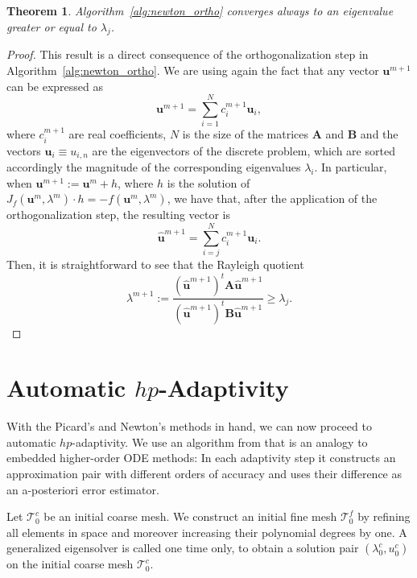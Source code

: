 \documentclass[preprint,12pt]{elsarticle}
\newtheorem{theorem}{Theorem}[section]
\newcommand{\cT}{\mathcal{T}}
\begin{document}
\begin{theorem}
Algorithm~\ref{alg:newton_ortho} converges always to an eigenvalue greater or equal to $\lambda_j$.
\end{theorem}

\begin{proof}
This result is a direct consequence of the orthogonalization step in Algorithm~\ref{alg:newton_ortho}.
We are using again the fact that any vector $\mathbf{u}^{m+1}$ can be expressed as 
$$
\mathbf{u}^{m+1}=\sum_{i=1}^N c_i^{m+1} \mathbf{u}_i,
$$
where $c_i^{m+1}$ are real coefficients, $N$ is the size of the matrices $\mathbf{A}$ and $\mathbf{B}$ and the vectors $\mathbf{u}_i\equiv u_{i,n}$ are the eigenvectors of the discrete problem, which are sorted accordingly the magnitude of the corresponding eigenvalues $\lambda_i$.
In particular, when $\mathbf{u}^{m+1}:=\mathbf{u}^m+h$, where $h$ is the solution of 
$J_f(\mathbf{u}^m,\lambda^m)\cdot h = - f(\mathbf{u}^m,\lambda^m)$, we have that, after the application of the orthogonalization step, the resulting vector is
$$
\mathbf{\hat u}^{m+1}=\sum_{i=j}^N c_i^{m+1} \mathbf{u}_i.
$$
Then, it is straightforward to see that the Rayleigh quotient
$$
\displaystyle\lambda^{m+1}:=\frac{(\mathbf{\hat u}^{m+1})^t\mathbf{A}\mathbf{\hat u}^{m+1}}{(\mathbf{\hat u}^{m+1})^t\mathbf{B}\mathbf{\hat u}^{m+1}} \ge \lambda_j.
$$
\end{proof}




\section{Automatic $hp$-Adaptivity}\label{sec:adapt}

With the Picard's and Newton's methods in hand, we can now proceed to automatic $hp$-adaptivity. 
We use an algorithm from \cite{solin3} that is an analogy to embedded higher-order ODE methods: 
In each adaptivity step it 
constructs an approximation pair with different orders of accuracy and uses their difference 
as an a-posteriori error estimator. 

Let $\cT^c_{0}$ be an initial coarse mesh. We construct an initial fine mesh $\cT^f_{0}$
by refining all elements in space and moreover increasing their polynomial degrees by one.
A generalized eigensolver is called one time only, 
to obtain a solution pair $(\lambda^c_{0}, u^c_{0})$
on the initial coarse mesh $\cT^c_{0}$. 
\end{document}
